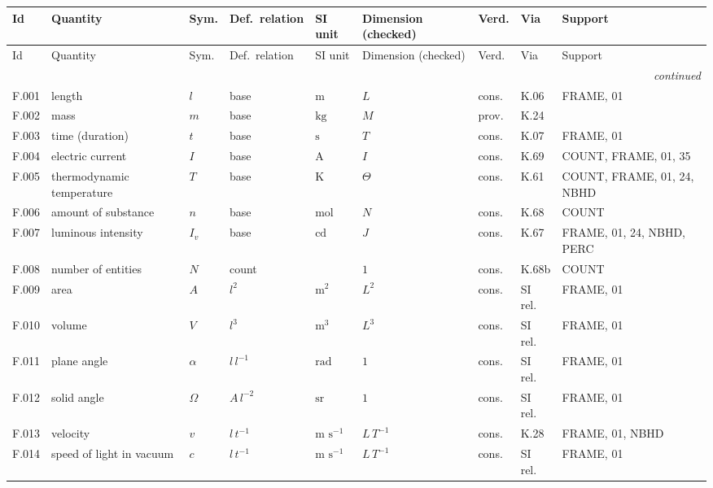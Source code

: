 {\scriptsize\setlength{\tabcolsep}{2.5pt}
\begin{longtable}{@{}l>{\raggedright\arraybackslash}p{2.4cm}l>{\raggedright\arraybackslash}p{1.9cm}>{\raggedright\arraybackslash}p{1.7cm}>{\raggedright\arraybackslash}p{2.3cm}ll>{\raggedright\arraybackslash}p{2.0cm}@{}}
\toprule
Id & Quantity & Sym. & Def.\ relation & SI unit & Dimension (checked) & Verd. & Via & Support \\
\midrule\endfirsthead
\toprule
Id & Quantity & Sym. & Def.\ relation & SI unit & Dimension (checked) & Verd. & Via & Support \\
\midrule\endhead
\midrule\multicolumn{9}{r}{\emph{continued}}\\\endfoot
\bottomrule\endlastfoot
F.001 & length & $l$ & base & $\mathrm{m}$ & $L$ & cons. & K.06 & FRAME, 01 \\
F.002 & mass & $m$ & base & $\mathrm{kg}$ & $M$ & prov. & K.24 & 24 \\
F.003 & time (duration) & $t$ & base & $\mathrm{s}$ & $T$ & cons. & K.07 & FRAME, 01 \\
F.004 & electric current & $I$ & base & $\mathrm{A}$ & $I$ & cons. & K.69 & COUNT, FRAME, 01, 35 \\
F.005 & thermodynamic temperature & $T$ & base & $\mathrm{K}$ & $\Theta$ & cons. & K.61 & COUNT, FRAME, 01, 24, NBHD \\
F.006 & amount of substance & $n$ & base & $\mathrm{mol}$ & $N$ & cons. & K.68 & COUNT \\
F.007 & luminous intensity & $I_v$ & base & $\mathrm{cd}$ & $J$ & cons. & K.67 & FRAME, 01, 24, NBHD, PERC \\
F.008 & number of entities & $N$ & count & 1 & $1$ & cons. & K.68b & COUNT \\
F.009 & area & $A$ & ${l}^{2}$ & $\mathrm{m}^{2}$ & $L^{2}$ & cons. & SI rel. & FRAME, 01 \\
F.010 & volume & $V$ & ${l}^{3}$ & $\mathrm{m}^{3}$ & $L^{3}$ & cons. & SI rel. & FRAME, 01 \\
F.011 & plane angle & $\alpha$ & $l\,{l}^{-1}$ & $\mathrm{rad}$ & $1$ & cons. & SI rel. & FRAME, 01 \\
F.012 & solid angle & $\Omega$ & $A\,{l}^{-2}$ & $\mathrm{sr}$ & $1$ & cons. & SI rel. & FRAME, 01 \\
F.013 & velocity & $v$ & $l\,{t}^{-1}$ & $\mathrm{m}$ $\mathrm{s}^{-1}$ & $L\,T^{-1}$ & cons. & K.28 & FRAME, 01, NBHD \\
F.014 & speed of light in vacuum & $c$ & $l\,{t}^{-1}$ & $\mathrm{m}$ $\mathrm{s}^{-1}$ & $L\,T^{-1}$ & cons. & SI rel. & FRAME, 01 \\

\end{longtable}}
